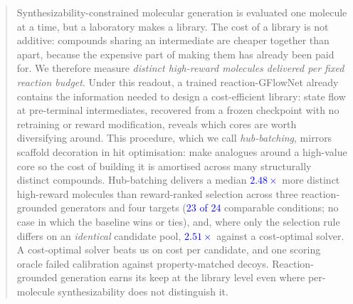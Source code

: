 \documentclass{article}
\newcommand{\checkval}[1]{\textcolor{blue}{#1}}
\begin{document}
\begin{abstract}

Synthesizability-constrained molecular generation is evaluated one molecule at a time, but a laboratory makes a library. The cost of a library is not additive: compounds sharing an intermediate are cheaper together than apart, because the expensive part of making them has already been paid for. We therefore measure \emph{distinct high-reward molecules delivered per fixed reaction budget}. Under this readout, a trained reaction-GFlowNet already contains the information needed to design a cost-efficient library: state flow at pre-terminal intermediates, recovered from a frozen checkpoint with no retraining or reward modification, reveals which cores are worth diversifying around. This procedure, which we call \emph{hub-batching}, mirrors scaffold decoration in hit optimisation: make analogues around a high-value core so the cost of building it is amortised across many structurally distinct compounds. Hub-batching delivers a median \checkval{$2.48\times$} more distinct high-reward molecules than reward-ranked selection across three reaction-grounded generators and four targets (\checkval{23 of 24} comparable conditions; no case in which the baseline wins or ties), and, where only the selection rule differs on an \emph{identical} candidate pool, \checkval{$2.51\times$} against a cost-optimal solver. A cost-optimal solver beats us on cost per candidate, and one scoring oracle failed calibration against property-matched decoys. Reaction-grounded generation earns its keep at the library level even where per-molecule synthesizability does not distinguish it.
\end{abstract}

\end{document}

